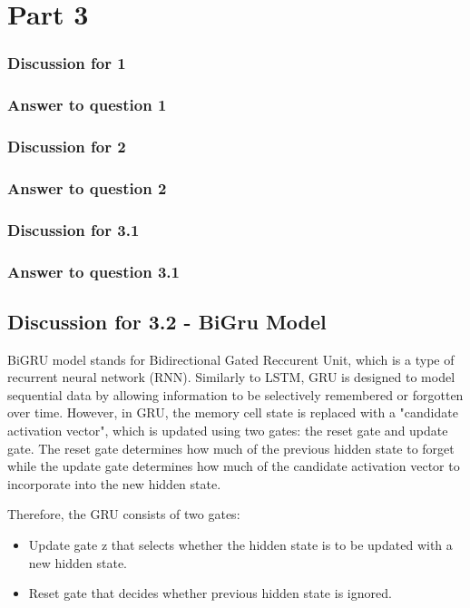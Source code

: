 \documentclass{article}
\begin{document}
\section*{Part 3}

\subsubsection*{Discussion for 1}

\subsubsection*{Answer to question 1}

\subsubsection*{Discussion for 2}

\subsubsection*{Answer to question 2}

\subsubsection*{Discussion for 3.1}

\subsubsection*{Answer to question 3.1}

\subsection*{Discussion for 3.2 - BiGru Model}
BiGRU model stands for Bidirectional Gated Reccurent Unit, which is a type of recurrent neural network (RNN). Similarly to LSTM, GRU is designed to model sequential data by allowing information to be selectively remembered or forgotten over time. However, in GRU, the memory cell state is replaced with a "candidate activation vector", which is updated using two gates: the reset gate and update gate. The reset gate determines how much of the previous hidden state to forget while the update gate determines how much of the candidate activation vector to incorporate into the new hidden state. 

Therefore, the GRU consists of two gates:
\begin{itemize}
    \item Update gate z that selects whether the hidden state is to be updated with a new hidden state. 
    \item Reset gate that decides whether previous hidden state is ignored. 
\end{itemize}
\end{document}
